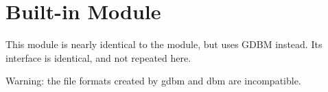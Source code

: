 \section{Built-in Module }

This module is nearly identical to the  module, but uses
GDBM instead.  Its interface is identical, and not repeated here.

Warning: the file formats created by gdbm and dbm are incompatible.
